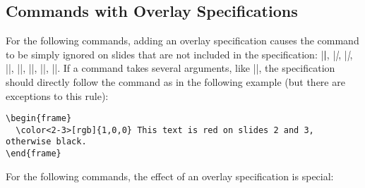 \subsection{Commands with Overlay Specifications}
\label{section-overlay-commands}

For the following commands, adding an overlay specification causes the
command to be simply ignored on slides that are not included in the
specification: |\textbf|, |\textit|, |\textsl|,
|\textrm|, |\textsf|, |\color|, |\alert|,
|\structure|. If a command takes several arguments, like
|\color|, the specification should directly follow the command as in
the following example (but there are exceptions to this rule):
\begin{verbatim}
\begin{frame}
  \color<2-3>[rgb]{1,0,0} This text is red on slides 2 and 3, otherwise black.
\end{frame}
\end{verbatim}

For the following commands, the effect of an overlay specification is
special:

